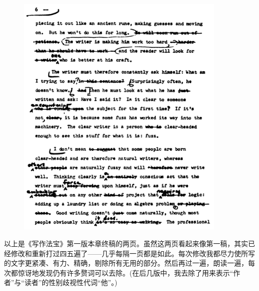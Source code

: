 \begin{figure}[!htb]
\centering
\includegraphics[width=0.9\textwidth]{figure/fig1-2.png}
\end{figure}


以上是《写作法宝》第一版本章终稿的两页。虽然这两页看起来像第一稿，其实已经修改和重新打过四五遍了——几乎每隔一页都是如此。每次修改我都尽力使所写的文字更紧凑、有力、精确，剔除所有无用的部分。然后再过一遍，朗读一遍，每次都惊讶地发现仍有许多赘词可以去除。(在后几版中，我去除了用来表示“作者”与“读者”的性别歧视性代词“他”。)